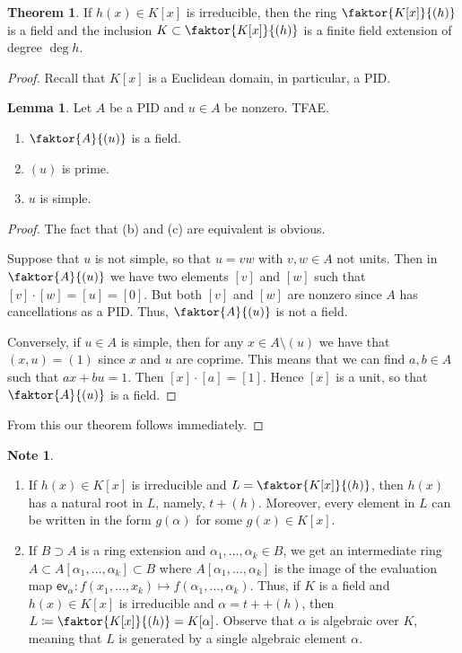 \documentclass[10pt,letterpaper,cm]{nupset}
\theoremstyle{definition}
\newtheorem{note}[definition]{Note}
\theoremstyle{theorem}
\newtheorem{theorem}[definition]{Theorem}
\newtheorem{lemma}[definition]{Lemma}
\theoremstyle{remark}
\newcommand{\1}{\mathbf{1}}
\newcommand{\0}{\vec 0}
\begin{document}
\begin{theorem}
If $h(x) \in K[x]$ is irreducible, then the ring $\faktor{K[x]}{(h)}$ is a field and the inclusion $K \subset \faktor{K[x]}{(h)}$ is a finite field extension of degree $\deg{h}$.
\end{theorem}
\begin{proof}
Recall that $K[x]$ is a Euclidean domain, in particular, a PID.
\begin{lemma}
Let $A$ be a PID and $u\in A$ be nonzero. TFAE.
\begin{enumerate}[label=(\alph*)]
\item $\faktor{A}{(u)}$ is a field.
\item $(u)$ is prime.
\item$u$ is simple.
\end{enumerate}
\end{lemma}
\begin{proof}
The fact that (b) and (c) are equivalent is obvious. 

\medskip

 Suppose that $u$ is not simple, so that $u= vw$ with $v,w \in A$ not units. Then in $\faktor{A}{(u)}$ we have two elements $[v]$ and $[w]$ such that $[v]\cdot [w] = [u] = [0]$. But both $[v]$ and $[w]$ are nonzero since $A$ has cancellations as a PID. Thus, $\faktor{A}{(u)}$ is not a field.

\medskip

 Conversely, if $u\in A$ is simple, then for any $x\in A\setminus (u)$ we have that $(x,u) = (1)$ since $x$ and $u$ are coprime. This means that we can find $a,b\in A$ such that $ax + bu =1$. Then $[x]\cdot[a] = [1]$. Hence $[x]$ is a unit, so that $\faktor{A}{(u)}$ is a field. 
\end{proof}$ $From this our theorem follows immediately. 
\end{proof}

\begin{note} $ $
\begin{enumerate}
\item
If $h(x) \in K[x]$ is irreducible  and $L = \faktor{K[x]}{(h)}$, then $h(x)$ has a natural root in $L$, namely, $t + (h)$. Moreover, every element in $L$ can be written in the form $g(\alpha)$ for some $g(x) \in K[x]$.
\item
If $B \supset A$  is a ring extension and $\alpha_1, \ldots, \alpha_k \in B$, we get an intermediate ring $A \subset A[\alpha_1, \ldots, \alpha_k] \subset B$ where $A[\alpha_1, \ldots, \alpha_k] $ is the image of the evaluation map $\mathsf{ev}_{\alpha} : f(x_1, \ldots, x_k) \mapsto f(\alpha_1, \ldots, \alpha_k)$. Thus, if $K$ is a field and $h(x) \in K[x]$ is irreducible and $\alpha = t + +(h)$, then $L\coloneqq \faktor{K[x]}{(h)} = K[\alpha]$. Observe that $\alpha$ is algebraic over $K$, meaning that $L$ is generated by a single algebraic element $\alpha$.
\end{enumerate}
\end{note}
\end{document}
